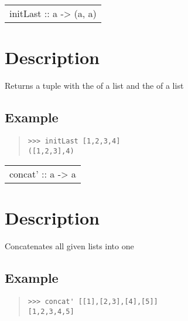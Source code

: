 \begin{haddockdesc}
\item[\begin{tabular}{@{}l}
initLast :: {\char 91}a{\char 93} -> ({\char 91}a{\char 93}, a)
\end{tabular}]
{\haddockbegindoc
\section*{Description}
Returns a tuple with the  of a list and the  of a list\par
\subsection*{Example}
\begin{quote}
{\haddockverb\begin{verbatim}
>>> initLast [1,2,3,4]
([1,2,3],4)

\end{verbatim}}
\end{quote}}
\end{haddockdesc}
\begin{haddockdesc}
\item[\begin{tabular}{@{}l}
concat' :: {\char 91}{\char 91}a{\char 93}{\char 93} -> {\char 91}a{\char 93}
\end{tabular}]
{\haddockbegindoc
\section*{Description}
Concatenates all given lists into one\par
\subsection*{Example}
\begin{quote}
{\haddockverb\begin{verbatim}
>>> concat' [[1],[2,3],[4],[5]]
[1,2,3,4,5]

\end{verbatim}}
\end{quote}}
\end{haddockdesc}
